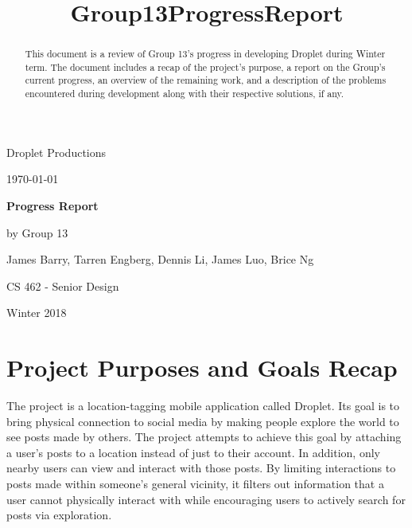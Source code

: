 \documentclass[draftclsnofoot, onecolumn, letterpaper,10pt,compsoc]{IEEEtran}
\title{Group13ProgressReport}
\def \TitlePageHeader{Droplet Productions}
\def \TitlePageTitle{Progress Report}
\def \GroupNumber{by Group 13}
\def \GroupMembers{James Barry, Tarren Engberg, Dennis Li, James Luo,  Brice Ng}
\def \CourseTitle{CS 462 - Senior Design}
\def \CourseTerm{Winter 2018}
\newcommand{\NameSigPair}[1]{\par
\makebox[2.75in][r]{#1} \hfil 	\makebox[3.25in]{\makebox[2.25in]{\hrulefill} \hfill		\makebox[.75in]{\hrulefill}}
\par\vspace{-12pt} \textit{\tiny\noindent
\makebox[2.75in]{} \hfil		\makebox[3.25in]{\makebox[2.25in][r]{Signature} \hfill	\makebox[.75in][r]{Date}}}}
\renewcommand{\NameSigPair}[1]{#1}
\begin{document}
\begin{titlepage}
    \begin{singlespace}
        \hfill    
        \par\vspace{.2in}
        \centering
        \scshape{
            \huge \TitlePageHeader \par
            {\large\today}\par
            \vspace{.5in}
            \textbf{\Huge \TitlePageTitle }\par
            \vfill
            \vspace{5pt}

            \vspace{5pt}
            {\Large
                \NameSigPair{\GroupNumber}\par
            	\NameSigPair{\GroupMembers}\par
                \NameSigPair{\CourseTitle}\par
                \NameSigPair{\CourseTerm}\par
            }
            \vspace{20pt}
        }
    \end{singlespace}
    \begin{abstract}
    This document is a review of Group 13's progress in developing Droplet during Winter term. The document includes a recap of the project's purpose, a report on the Group's current progress, an overview of the remaining work, and a description of the problems encountered during development along with their respective solutions, if any.
    \end{abstract}
\end{titlepage}

\newpage
{}
\clearpage

\pagebreak

\section{Project Purposes and Goals Recap}
The project is a location-tagging mobile application called Droplet. Its goal is to bring physical connection to social media by making people explore the world to see posts made by others. The project attempts to achieve this goal by attaching a user's posts to a location instead of just to their account. In addition, only nearby users can view and interact with those posts. By limiting interactions to posts made within someone's general vicinity, it filters out information that a user cannot physically interact with while encouraging users to actively search for posts via exploration.
\end{document}
